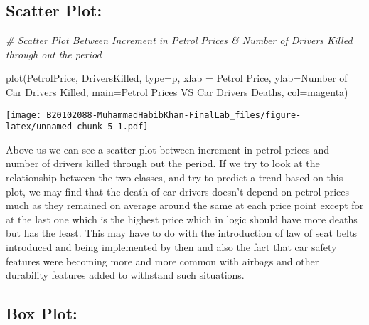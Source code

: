 \documentclass[
]{article}
\newenvironment{Shaded}{\begin{snugshade}}{\end{snugshade}}
\newcommand{\AttributeTok}[1]{\textcolor[rgb]{0.77,0.63,0.00}{#1}}
\newcommand{\CommentTok}[1]{\textcolor[rgb]{0.56,0.35,0.01}{\textit{#1}}}
\newcommand{\FunctionTok}[1]{\textcolor[rgb]{0.00,0.00,0.00}{#1}}
\newcommand{\NormalTok}[1]{#1}
\newcommand{\StringTok}[1]{\textcolor[rgb]{0.31,0.60,0.02}{#1}}
\begin{document}
\hypertarget{scatter-plot}{%
\subsection{Scatter Plot:}\label{scatter-plot}}

\begin{Shaded}
\begin{Highlighting}[]
\CommentTok{\# Scatter Plot Between Increment in Petrol Prices \& Number of Drivers Killed through out the period }

\FunctionTok{plot}\NormalTok{(PetrolPrice, DriversKilled, }\AttributeTok{type=}\StringTok{\textquotesingle{}p\textquotesingle{}}\NormalTok{, }\AttributeTok{xlab =} \StringTok{\textquotesingle{}Petrol Price\textquotesingle{}}\NormalTok{, }\AttributeTok{ylab=}\StringTok{\textquotesingle{}Number of Car Drivers Killed\textquotesingle{}}\NormalTok{, }\AttributeTok{main=}\StringTok{\textquotesingle{}Petrol Prices VS Car Drivers Deaths\textquotesingle{}}\NormalTok{, }\AttributeTok{col=}\StringTok{\textquotesingle{}magenta\textquotesingle{}}\NormalTok{)}
\end{Highlighting}
\end{Shaded}

\texttt{[image: B20102088-MuhammadHabibKhan-FinalLab\_files/figure-latex/unnamed-chunk-5-1.pdf]}

Above us we can see a scatter plot between increment in petrol prices
and number of drivers killed through out the period. If we try to look
at the relationship between the two classes, and try to predict a trend
based on this plot, we may find that the death of car drivers doesn't
depend on petrol prices much as they remained on average around the same
at each price point except for at the last one which is the highest
price which in logic should have more deaths but has the least. This may
have to do with the introduction of law of seat belts introduced and
being implemented by then and also the fact that car safety features
were becoming more and more common with airbags and other durability
features added to withstand such situations.

\hypertarget{box-plot}{%
\subsection{Box Plot:}\label{box-plot}}
\end{document}
